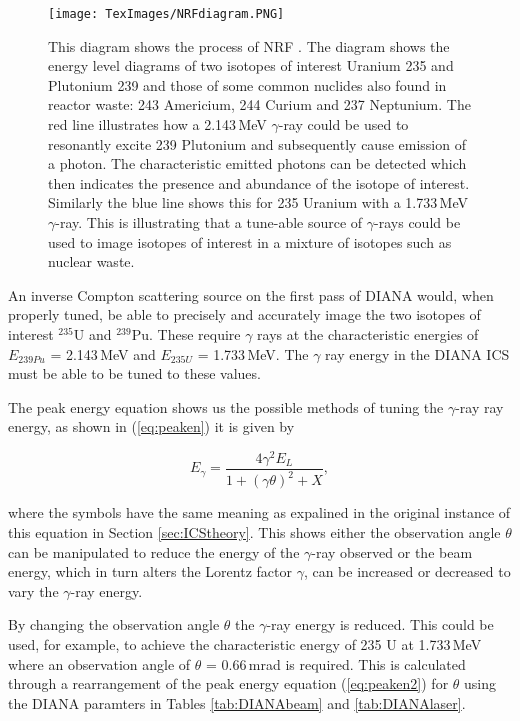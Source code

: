 \documentclass[11pt]{article}
\begin{document}
\begin{figure}[H]
\centering
\texttt{[image: TexImages/NRFdiagram.PNG]}
\caption{\label{fig:NRFdiag} This diagram shows the process of NRF \cite{NRFdiag}. The diagram shows the energy level diagrams of two isotopes of interest Uranium 235 and Plutonium 239 and those of some common nuclides also found in reactor waste: 243 Americium, 244 Curium and 237 Neptunium. The red line illustrates how a 2.143\,MeV  $\gamma$-ray could be used to resonantly excite 239 Plutonium and subsequently cause emission of a photon. The characteristic emitted photons can be detected which then indicates the presence and abundance of the isotope of interest. Similarly the blue line shows this for 235 Uranium with a 1.733\,MeV $\gamma$-ray. This is illustrating that a tune-able source of $\gamma$-rays could be used to image isotopes of interest in a mixture of isotopes such as nuclear waste.}
\end{figure}

An inverse Compton scattering source on the first pass of DIANA would, when properly tuned, be able to precisely and accurately image the two isotopes of interest $^{235}$U and $^{239}$Pu. These require $\gamma$ rays at the characteristic energies of $E_{239 Pu}$ = 2.143\,MeV and $E_{235 U}$ = 1.733\,MeV. The $\gamma$ ray energy in the DIANA ICS must be able to be tuned to these values.

The peak energy equation shows us the possible methods of tuning the $\gamma$-ray ray energy, as shown in (\ref{eq:peaken}) it is given by 

\begin{equation}
E_{\gamma} = \frac{4\gamma^{2} E_{L}}{1+\left(\gamma\theta\right)^{2}+X},
\label{eq:peaken2}
\end{equation}  

\noindent where the symbols have the same meaning as expalined in the original instance of this equation in Section \ref{sec:ICStheory}. This shows either the observation angle $\theta$ can be manipulated to reduce the energy of the $\gamma$-ray observed or the beam energy, which in turn alters the Lorentz factor $\gamma$, can be increased or decreased to vary the $\gamma$-ray energy.

By changing the observation angle $\theta$ the $\gamma$-ray energy is reduced. This could be used, for example, to achieve the characteristic energy of 235 U at 1.733\,MeV where an observation angle of $\theta$ = 0.66\,mrad is required. This is calculated through a rearrangement of the peak energy equation (\ref{eq:peaken2}) for $\theta$ using the DIANA paramters in Tables \ref{tab:DIANAbeam} and \ref{tab:DIANAlaser}.
\end{document}
